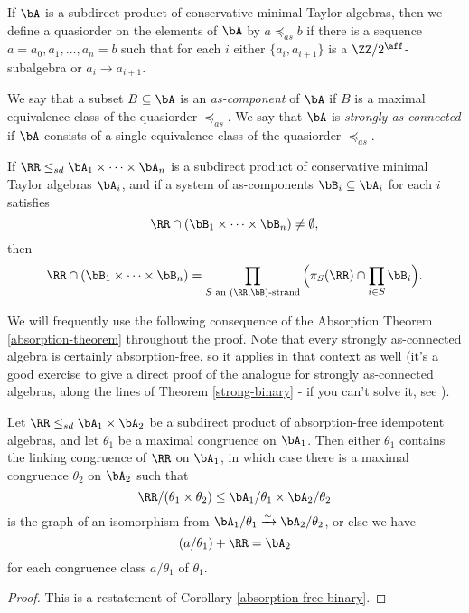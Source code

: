 \begin{defn} If $\bA$ is a subdirect product of conservative minimal Taylor algebras, then we define a quasiorder on the elements of $\bA$ by $a \preceq_{as} b$ if there is a sequence $a = a_0, a_1, ..., a_n = b$ such that for each $i$ either $\{a_i,a_{i+1}\}$ is a $\ZZ/2^{\aff}$-subalgebra or $a_i \rightarrow a_{i+1}$.

We say that a subset $B \subseteq \bA$ is an \emph{as-component} of $\bA$ if $B$ is a maximal equivalence class of the quasiorder $\preceq_{as}$. We say that $\bA$ is \emph{strongly as-connected} if $\bA$ consists of a single equivalence class of the quasiorder $\preceq_{as}$.
\end{defn}

\begin{thm} If $\RR \le_{sd} \bA_1 \times \cdots \times \bA_n$ is a subdirect product of conservative minimal Taylor algebras $\bA_i$, and if a system of as-components $\bB_i \subseteq \bA_i$ for each $i$ satisfies
\[
\RR \cap (\bB_1 \times \cdots \times \bB_n) \ne \emptyset,
\]
then
\[
\RR \cap (\bB_1 \times \cdots \times \bB_n) = \prod_{S\text{ an }(\RR,\bB)\text{-strand}} \Big(\pi_S(\RR) \cap \prod_{i\in S}\bB_i\Big).
\]
\end{thm}

We will frequently use the following consequence of the Absorption Theorem \ref{absorption-theorem} throughout the proof. Note that every strongly as-connected algebra is certainly absorption-free, so it applies in that context as well (it's a good exercise to give a direct proof of the analogue for strongly as-connected algebras, along the lines of Theorem \ref{strong-binary} - if you can't solve it, see \cite{bulatov-conservative-rerevisited}).

\begin{prop}\label{prop-absorption-free-linking} Let $\RR \le_{sd} \bA_1 \times \bA_2$ be a subdirect product of absorption-free idempotent algebras, and let $\theta_1$ be a maximal congruence on $\bA_1$. Then either $\theta_1$ contains the linking congruence of $\RR$ on $\bA_1$, in which case there is a maximal congruence $\theta_2$ on $\bA_2$ such that
\[
\RR/(\theta_1\times\theta_2) \le \bA_1/\theta_1 \times \bA_2/\theta_2
\]
is the graph of an isomorphism from $\bA_1/\theta_1 \xrightarrow{\sim} \bA_2/\theta_2$, or else we have
\[
(a/\theta_1) + \RR = \bA_2
\]
for each congruence class $a/\theta_1$ of $\theta_1$.
\end{prop}
\begin{proof} This is a restatement of Corollary \ref{absorption-free-binary}.
\end{proof}

